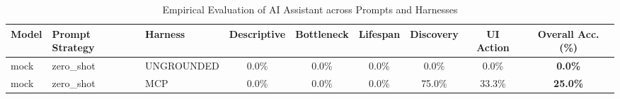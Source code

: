 \begin{table}[t]
\centering
\small
\caption{Empirical Evaluation of AI Assistant across Prompts and Harnesses}
\label{tab:assistant_eval}
\begin{tabular}{lllcccccc}
\toprule
\textbf{Model} & \textbf{Prompt Strategy} & \textbf{Harness} & \textbf{Descriptive} & \textbf{Bottleneck} & \textbf{Lifespan} & \textbf{Discovery} & \textbf{UI Action} & \textbf{Overall Acc. (\%)} \\
\midrule
mock & zero\_shot & UNGROUNDED & 0.0\% & 0.0\% & 0.0\% & 0.0\% & 0.0\% & \textbf{0.0\%} \\
mock & zero\_shot & MCP & 0.0\% & 0.0\% & 0.0\% & 75.0\% & 33.3\% & \textbf{25.0\%} \\
\bottomrule
\end{tabular}
\end{table}
